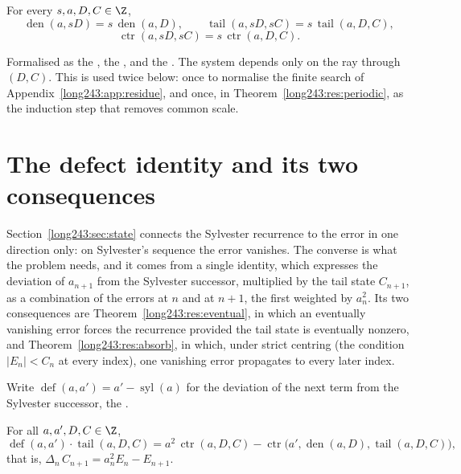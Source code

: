 \documentclass[11pt]{article}
\newcommand{\sylnext}{\operatorname{syl}}
\newcommand{\den}{\operatorname{den}}
\newcommand{\tail}{\operatorname{tail}}
\newcommand{\ctr}{\operatorname{ctr}}
\newcommand{\defect}{\operatorname{def}}
\begin{document}
\begin{proposition}\label{long243:res:scale}
For every $s,a,D,C\in\Z$,
\[
 \den(a,sD)=s\,\den(a,D),\qquad
 \tail(a,sD,sC)=s\,\tail(a,D,C),
\]
\[
 \ctr(a,sD,sC)=s\,\ctr(a,D,C).
\]
\end{proposition}

\noindent Formalised as the
, the
, and the
.  The system depends only on the ray through $(D,C)$.  This is
used twice below: once to normalise the finite search of
Appendix~\ref{long243:app:residue}, and once, in Theorem~\ref{long243:res:periodic}, as the
induction step that removes common scale.

\section{The defect identity and its two consequences}\label{long243:sec:defect}

Section~\ref{long243:sec:state} connects the Sylvester recurrence to the error in one
direction only: on Sylvester's sequence the error vanishes.  The converse is
what the problem needs, and it comes from a single identity, which expresses
the deviation of $a_{n+1}$
from the Sylvester successor, multiplied by the tail state $C_{n+1}$, as a
combination of the errors at $n$ and at $n+1$, the first weighted by
$a_n^{2}$.  Its two consequences are
Theorem~\ref{long243:res:eventual}, in which an eventually vanishing error forces the
recurrence provided the tail state is eventually nonzero, and
Theorem~\ref{long243:res:absorb}, in which, under strict centring (the condition
$|E_n|<C_n$ at every index), one vanishing error propagates to every later
index.

Write $\defect(a,a')=a'-\sylnext(a)$ for the deviation of the next term from
the Sylvester successor, the
.

\begin{theorem}\label{long243:res:defect}
For all $a,a',D,C\in\Z$,
\[
 \defect(a,a')\cdot\tail(a,D,C)
 =a^{2}\,\ctr(a,D,C)-\ctr\bigl(a',\den(a,D),\tail(a,D,C)\bigr),
\]
that is, $\Delta_n\,C_{n+1}=a_n^{2}E_n-E_{n+1}$.
\end{theorem}
\end{document}
